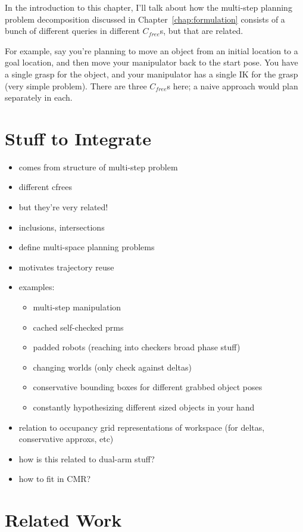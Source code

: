 \documentclass{report}
\begin{document}
In the introduction to this chapter,
I'll talk about how the multi-step planning problem decomposition
discussed in Chapter~\ref{chap:formulation}
consists of a bunch of different queries in different
$C_{free}$s, but that are related.

For example, say you're planning to move an object from an initial
location to a goal location,
and then move your manipulator back to the start pose.
You have a single grasp for the object,
and your manipulator has a single IK for the grasp (very simple problem).
There are three $C_{free}$s here;
a naive approach would plan separately in each.

\section{Stuff to Integrate}

\begin{itemize}
\item comes from structure of multi-step problem
\item different cfrees
\item but they're very related!
\item inclusions, intersections
\item define multi-space planning problems
\item motivates trajectory reuse
\item examples:
   \begin{itemize}
   \item multi-step manipulation
   \item cached self-checked prms
   \item padded robots (reaching into checkers broad phase stuff)
   \item changing worlds (only check against deltas)
   \item conservative bounding boxes for different grabbed object poses
   \item constantly hypothesizing different sized objects in your hand
   \end{itemize}
\item relation to occupancy grid representations of workspace
   (for deltas, conservative approxs, etc)
\item how is this related to dual-arm stuff?
\item how to fit in CMR?
\end{itemize}

\section{Related Work}
\end{document}
